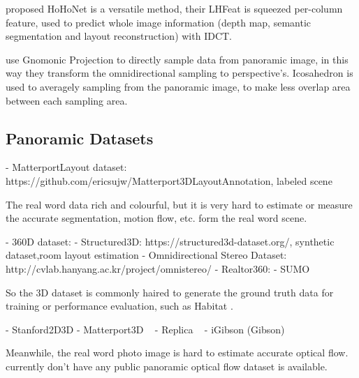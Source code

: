 \citet{SunSC2021} proposed HoHoNet is a versatile method, their LHFeat is squeezed per-column feature, used to predict whole image information (depth map, semantic segmentation and layout reconstruction) with IDCT. 
\cite{WangYSCT2020}

\cite{CoorsCG2018} use Gnomonic Projection to directly sample data from panoramic image, in this way they transform the omnidirectional sampling to perspective's.
\cite{EderPVBF2019}\citet{EderSLF2020} Icosahedron is used to averagely sampling from the panoramic image, to make less overlap area between each sampling area.
\citet{LuoZSX2019}
\citet{ZhangLSC2019}
\citet{LeeJYJY2019}

\citet{GkitsZAZD2020}
\citet{SuG2019}
\citet{CohenGKW2018}
\citet{JiangHKPMN2019}

\subsection{Panoramic Datasets}

- MatterportLayout dataset: https://github.com/ericsujw/Matterport3DLayoutAnnotation, labeled scene

The real word data rich and colourful, but it is very hard to estimate or measure the accurate segmentation, motion flow, etc. form the real word scene.

- 360D dataset:
- Structured3D: https://structured3d-dataset.org/, synthetic dataset,room layout estimation
- Omnidirectional Stereo Dataset: http://cvlab.hanyang.ac.kr/project/omnistereo/
- Realtor360: 
- SUMO

So the 3D dataset is commonly haired to generate the ground truth data for training or performance evaluation, such as Habitat \cite{SavvaKMZWJSLKMPB2019}.

- Stanford2D3D \cite{ArmenSZS2017}
- Matterport3D ~\cite{ChangDFHNSSZZ2017}
- Replica ~\cite{StrauWMCWGEMRVCYBYPYZLCBGMPSBSNGLN2019}
- iGibson (Gibson)


Meanwhile, the real word photo image is hard to estimate accurate optical flow.
 currently don't have any public panoramic optical flow dataset is available.
